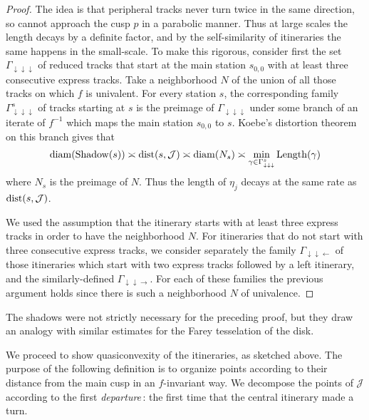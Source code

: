 \begin{proof}
The idea is that peripheral tracks never turn twice in the same direction, so cannot approach the cusp $p$ in a parabolic manner. Thus at large scales the length decays by a definite factor, and by the self-similarity of itineraries the same happens in the small-scale.
To make this rigorous, consider first the set $\Gamma_{\downarrow \downarrow \downarrow}$ of reduced tracks that start at the main station $s_{0,0}$ with at least three consecutive express tracks. Take a neighborhood $N$ of the union of all those tracks on which $f$ is univalent. %
For every station $s$, the corresponding family $\Gamma^s_{\downarrow \downarrow \downarrow}$ of tracks starting at $s$ is the preimage of $\Gamma_{\downarrow \downarrow \downarrow}$  under some branch of an iterate of $f^{-1}$ which maps the main station $s_{0,0}$ to $s$.
Koebe's distortion theorem on this branch gives that
\begin{equation}
\operatorname{diam}(\operatorname{Shadow}(s)) \asymp \operatorname{dist} (s,\mathcal J) \asymp \operatorname{diam} (N_s) \asymp \min_{\gamma \in \Gamma^s_{\downarrow \downarrow \downarrow}} \operatorname{Length}(\gamma)
\end{equation}
where $N_s$ is the preimage of $N$. Thus the length of $\eta_j$ decays at the same rate as $\operatorname{dist}(s,\mathcal J)$. %

We used the assumption that the itinerary starts with at least three express tracks in order to have the neighborhood $N$. For itineraries that do not start with three consecutive express tracks, we consider separately the family $\Gamma_{\downarrow \downarrow \leftarrow}$ of those itineraries which start with two express tracks followed by a left itinerary, and the similarly-defined $\Gamma_{\downarrow \downarrow \rightarrow}$. For each of these families the previous argument holds since there is such a neighborhood $N$ of univalence.
\end{proof}

The shadows were not strictly necessary for the preceding proof, but they draw an analogy with similar estimates for the Farey tesselation of the disk.

We proceed to show quasiconvexity of the itineraries, as sketched above. The purpose of the following definition is to organize points according to their distance from the main cusp in an $f$-invariant way. We decompose the points of $\mathcal J$ according to the first \emph{departure}\,: the first time that the central itinerary made a turn.


